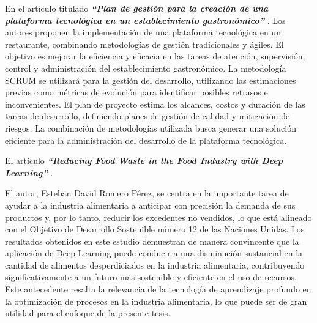 
\vspace{1\baselineskip}
En el artículo titulado  \textbf{\textit{“Plan de gestión para la creación de una plataforma tecnológica en un establecimiento gastronómico” }}\cite{sanchez2018sistemas}. Los autores proponen la implementación de una plataforma tecnológica en un restaurante, combinando metodologías de gestión tradicionales y ágiles. El objetivo es mejorar la eficiencia y eficacia en las tareas de atención, supervisión, control y administración del establecimiento gastronómico. La metodología SCRUM se utilizará para la gestión del desarrollo, utilizando las estimaciones previas como métricas de evolución para identificar posibles retrasos e inconvenientes. El plan de proyecto estima los alcances, costos y duración de las tareas de desarrollo, definiendo planes de gestión de calidad y mitigación de riesgos. La combinación de metodologías utilizada busca generar una solución eficiente para la administración del desarrollo de la plataforma tecnológica. 


\vspace{1\baselineskip}
El artículo \textbf{\textit{ “Reducing Food Waste in the Food Industry with Deep Learning” }}\cite{afanador2022diseno}. 

El autor, Esteban David Romero Pérez, se centra en la importante tarea de ayudar a la industria alimentaria a anticipar con precisión la demanda de sus productos y, por lo tanto, reducir los excedentes no vendidos, lo que está alineado con el Objetivo de Desarrollo Sostenible número 12 de las Naciones Unidas. Los resultados obtenidos en este estudio demuestran de manera convincente que la aplicación de Deep Learning puede conducir a una disminución sustancial en la cantidad de alimentos desperdiciados en la industria alimentaria, contribuyendo significativamente a un futuro más sostenible y eficiente en el uso de recursos. Este antecedente resalta la relevancia de la tecnología de aprendizaje profundo en la optimización de procesos en la industria alimentaria, lo que puede ser de gran utilidad para el enfoque de la presente tesis.

